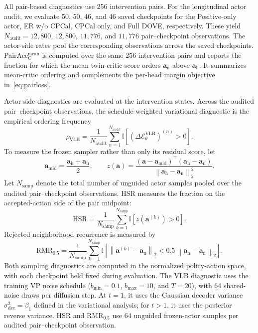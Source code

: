 \documentclass[9pt,journal]{IEEEtran}
\newcommand{\DOVE}{DOVE}
\newcommand{\CPCal}{\ensuremath{\mathrm{CPCal}}}
\newcommand{\Eelbo}{\ensuremath{\mathcal{E}_{\theta}^{\mathrm{VLB}}}}
\newcommand{\ind}{\mathbb{I}}
\newcommand{\va}{\bm{a}}
\newcommand{\vah}{\ensuremath{\va_{\mathrm h}}}      %
\newcommand{\van}{\ensuremath{\va_{\mathrm n}}}      %
\begin{document}
All pair-based diagnostics use 256 intervention pairs.
For the longitudinal actor audit, we evaluate 50, 50, 46, and 46 saved
checkpoints for the Positive-only actor, ER w/o \CPCal{},
\CPCal{} only, and Full \DOVE{}, respectively.
These yield $N_{\mathrm{audit}}=12{,}800$, $12{,}800$, $11{,}776$,
and $11{,}776$ pair--checkpoint observations.
The actor-side rates pool the corresponding observations across the
saved checkpoints.
PairAcc$_{\mathrm C}^{\mathrm{mean}}$ is computed over the same
256 intervention pairs and reports the fraction for which the mean
twin-critic score orders $\van$ above $\vah$.
It summarizes mean-critic ordering and complements the per-head margin
objective in~\eqref{eq:pairloss}.

Actor-side diagnostics are evaluated at the intervention states.
Across the audited pair--checkpoint observations, the schedule-weighted
variational diagnostic is the empirical ordering frequency
\[
\rho_{\mathrm{VLB}}
=
\frac{1}{N_{\mathrm{audit}}}
\sum_{n=1}^{N_{\mathrm{audit}}}
\ind\!\left[
\left(\Delta\Eelbo\right)^{(n)}>0
\right].
\]
To measure the frozen sampler rather than only its residual score, let
\[
\va_{\mathrm{mid}}
=
\frac{\vah+\van}{2},
\qquad
z(\va)
=
\frac{
\left(\va-\va_{\mathrm{mid}}\right)^\top
\left(\vah-\van\right)
}{
\left\lVert\vah-\van\right\rVert_2^2
}.
\]
Let $N_{\mathrm{samp}}$ denote the total number of unguided actor
samples pooled over the audited pair--checkpoint observations.
HSR measures the fraction on the accepted-action side of the pair
midpoint:
\[
\mathrm{HSR}
=
\frac{1}{N_{\mathrm{samp}}}
\sum_{k=1}^{N_{\mathrm{samp}}}
\ind\!\left[
z\!\left(\va^{(k)}\right)>0
\right].
\]
Rejected-neighborhood recurrence is measured by
\[
\mathrm{RMR}_{0.5}
=
\frac{1}{N_{\mathrm{samp}}}
\sum_{k=1}^{N_{\mathrm{samp}}}
\ind\!\left[
\left\lVert\va^{(k)}-\van\right\rVert_2
<
0.5\,
\left\lVert\vah-\van\right\rVert_2
\right].
\]
Both sampling diagnostics are computed in the normalized policy-action
space, with each checkpoint held fixed during evaluation.
The VLB diagnostic uses the training VP noise schedule
($b_{\min}=0.1$, $b_{\max}=10$, and $T=20$), with 64 shared-noise
draws per diffusion step.
At $t=1$, it uses the Gaussian decoder variance
$\sigma_{\mathrm{dec}}^2=\beta_1$ defined in the variational analysis;
for $t>1$, it uses the posterior reverse variance.
HSR and RMR$_{0.5}$ use 64 unguided frozen-actor samples per audited
pair--checkpoint observation.
\end{document}
